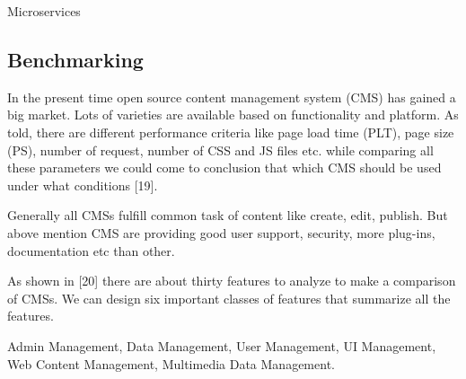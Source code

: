 \documentclass{sig-alternate}
\begin{document}
Microservices















\subsection{Benchmarking}
In the present time open source content management system (CMS) has gained a big market. Lots of varieties are available based on functionality and platform.
As told, there are different performance criteria like page load time (PLT), page size (PS), number of request, number of CSS and JS files etc. while comparing all these parameters we could come to conclusion that which CMS should be used under what conditions [19].




Generally all CMSs fulfill common task of content like create, edit, publish. But above mention CMS are providing good user support, security, more plug-ins, documentation etc than other.
 
As shown in [20] there are about thirty features to analyze to make a comparison of CMSs. We can design six important classes of features that summarize all the features.


Admin Management, Data Management, User Management, UI Management, Web Content Management, Multimedia Data Management.

















\end{document}
